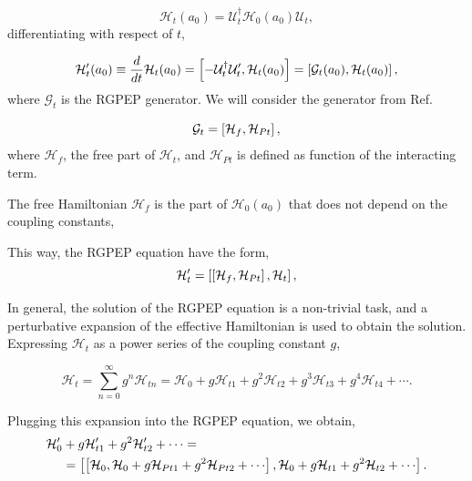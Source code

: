 \documentclass[11pt,a4paper,twoside,pdf]{article}
\numberwithin{equation}{section}
\begin{document}
\begin{equation}
    \mathcal{H}_t(a_0) = \mathcal{U}_t^\dagger\mathcal{H}_0(a_0) \mathcal{U}_t,
\end{equation}
differentiating with respect of $t$, 

\begin{equation}
    \mathcal{H}_t^\prime (a_0) \equiv \frac{d}{dt}\mathcal{H}_t(a_0) = 
    \left[ -\mathcal{U}_t^\dagger \mathcal{U}_t^\prime, \mathcal{H}_t(a_0) \right] 
    = \left[ \mathcal{G}_t(a_0), \mathcal{H}_t(a_0) \right],
\end{equation}
where $\mathcal{G}_t$ is the RGPEP generator. We will consider the generator 
from Ref. \cite{PEP}

\begin{equation}
    \mathcal{G}_t = \left[ \mathcal{H}_f, \mathcal{H}_{Pt} \right],
\end{equation}
where $\mathcal{H}_f$, the free part of $\mathcal{H}_t$, and $\mathcal{H}_{Pt}$ is 
defined as function of the interacting term. 

The free Hamiltonian $\mathcal{H}_f$ is the part of $\mathcal{H}_0(a_0)$ that does 
not depend on the coupling constants, 

This way, the RGPEP equation have the form,
\begin{equation}
    \mathcal{H}_t^\prime =  \left[ \left[ \mathcal{H}_f, \mathcal{H}_{Pt} \right], \mathcal{H}_t \right],
\end{equation}

In general, the solution of the RGPEP equation is a non-trivial task, and a perturbative
expansion of the effective Hamiltonian is used to obtain the solution. Expressing  
$\mathcal{H}_t$ as a power series of the coupling constant $g$,

\begin{equation}
    \mathcal{H}_t = \sum_{n=0}^{\infty} g^n \mathcal{H}_{t n} = 
    \mathcal{H}_{0} + g \mathcal{H}_{t 1} + g^2 \mathcal{H}_{t 2} + g^3 \mathcal{H}_{t 3} +
    g^4 \mathcal{H}_{t 4} + \cdots.
\end{equation}

Plugging this expansion into the RGPEP equation, we obtain,
\begin{align}
    \begin{split}
    \mathcal{H}_{0}^\prime & + g \mathcal{H}_{t 1}^\prime  + g^2 \mathcal{H}_{t 2}^\prime
     + \cdots =  \\
     &= \sbrackets{\sbrackets{\mathcal{H}_0, \mathcal{H}_{0} + g \mathcal{H}_{Pt 1} 
     + g^2 \mathcal{H}_{Pt 2} + \cdots}, \mathcal{H}_{0} + g \mathcal{H}_{t 1} + g^2 \mathcal{H}_{t 2} + \cdots}. 
    \end{split}
\end{align}
\end{document}
